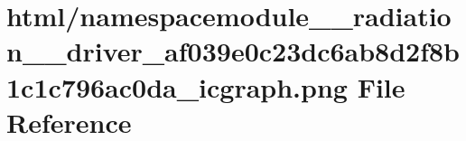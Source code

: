 \hypertarget{namespacemodule____radiation____driver__af039e0c23dc6ab8d2f8b1c1c796ac0da__icgraph_8png}{}\section{html/namespacemodule\+\_\+\+\_\+radiation\+\_\+\+\_\+driver\+\_\+af039e0c23dc6ab8d2f8b1c1c796ac0da\+\_\+icgraph.png File Reference}
\label{namespacemodule____radiation____driver__af039e0c23dc6ab8d2f8b1c1c796ac0da__icgraph_8png}
